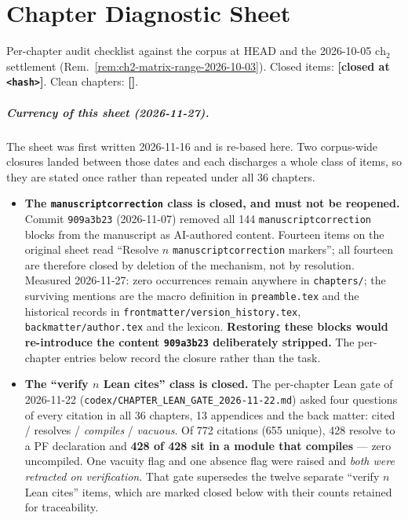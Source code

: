 \chapter{Chapter Diagnostic Sheet}
\label{app:chapter-diagnostic-sheet}

Per-chapter audit checklist against the corpus at HEAD and the 2026-10-05
$\mathrm{ch}_2$ settlement (Rem.~\ref{rem:ch2-matrix-range-2026-10-03}).
Closed items: \textbf{[closed at \texttt{<hash>}]}. Clean chapters:
\textbf{[\checkmark]}.

\paragraph{Currency of this sheet (2026-11-27).}
The sheet was first written 2026-11-16 and is re-based here. Two corpus-wide
closures landed between those dates and each discharges a whole class of items,
so they are stated once rather than repeated under all 36 chapters.

\begin{itemize}
\item \textbf{The \texttt{manuscriptcorrection} class is closed, and must not be
reopened.} Commit \texttt{909a3b23} (2026-11-07) removed all 144
\texttt{manuscriptcorrection} blocks from the manuscript as AI-authored
content. Fourteen items on the original sheet read ``Resolve $n$
\texttt{manuscriptcorrection} markers''; all fourteen are therefore closed by
deletion of the mechanism, not by resolution. Measured 2026-11-27: zero
occurrences remain anywhere in \texttt{chapters/}; the surviving mentions are
the macro definition in \texttt{preamble.tex} and the historical records in
\texttt{frontmatter/version\_history.tex}, \texttt{backmatter/author.tex} and
the lexicon. \textbf{Restoring these blocks would re-introduce the content
\texttt{909a3b23} deliberately stripped.} The per-chapter entries below record
the closure rather than the task.

\item \textbf{The ``verify $n$ Lean cites'' class is closed.} The per-chapter
Lean gate of 2026-11-22 (\texttt{codex/CHAPTER\_LEAN\_GATE\_2026-11-22.md})
asked four questions of every citation in all 36 chapters, 13 appendices and
the back matter: cited / resolves / \emph{compiles} / \emph{vacuous}. Of 772
citations (655 unique), 428 resolve to a PF declaration and \textbf{428 of 428
sit in a module that compiles} --- zero uncompiled. One vacuity flag and one
absence flag were raised and \emph{both were retracted on verification}. That
gate supersedes the twelve separate ``verify $n$ Lean cites'' items, which are
marked closed below with their counts retained for traceability.
\end{itemize}


